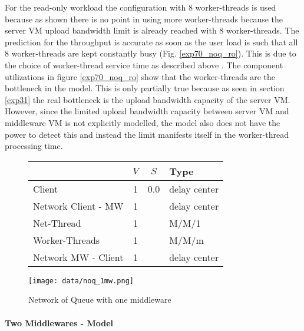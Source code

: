 \documentclass[report.tex]{subfiles}
\begin{document}
For the read-only workload the configuration with 8 worker-threads is used because as shown there is no point in using more worker-threads because the server VM upload bandwidth limit is already reached with 8 worker-threads. The prediction for the throughput is accurate as soon as the user load is such that all 8 worker-threads are kept constantly busy (Fig. \ref{exp70_noq_ro}). This is due to the choice of worker-thread service time as described above . The component utilizations in figure \ref{exp70_noq_ro} show that the worker-threads are the bottleneck in the model. This is only partially true because as seen in section \ref{exp31} the real bottleneck is the upload bandwidth capacity of the server VM. However, since the limited upload bandwidth capacity between server VM and middleware VM is not explicitly modelled, the model also does not have the power to detect this and instead the limit manifests itself in the worker-thread processing time.

\begin{figure}
	\begin{minipage}[c]{0.45\linewidth}
		\centering
		\scriptsize{
			\begin{tabular}{|l|c|c|l|}
				\hline 
				& $V$ & $S$ & Type \Tstrut\\ 
				\hline 
				Client & 1 & 0.0  & delay center \Tstrut\\ 
				\hline 
				Network Client - MW & 1 &  & delay center \Tstrut\\  
				Net-Thread & 1 &  & M/M/1 \\ 
				Worker-Threads & 1 &  & M/M/m  \\ 
				Network MW - Client & 1 &  & delay center \\ 
				\hline 
			\end{tabular} 
		} 
	\end{minipage}
	\hspace{0.5cm}
	\begin{minipage}[c]{0.45\linewidth}
	\centering
	\texttt{[image: data/noq\_1mw.png]}
\end{minipage}
	\caption{Network of Queue with one middleware}
	\label{exp70_noq_1mw}
\end{figure}


\paragraph{Two Middlewares - Model}
\end{document}
